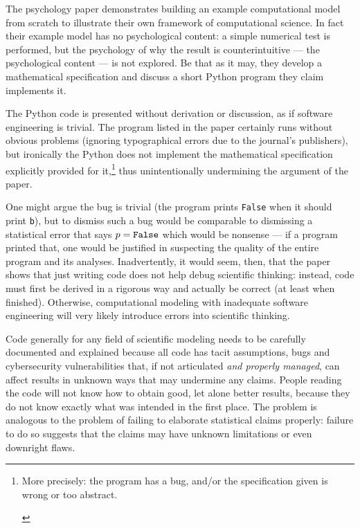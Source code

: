 \begin{change}
The psychology paper \cite{psychological-modeling} demonstrates building an example computational model from scratch to illustrate their own framework of computational science. In fact their example model has no psychological content: a simple numerical test is performed, but the psychology of why the result is counterintuitive --- the psychological content --- is not explored. Be that as it may, they develop a mathematical specification and discuss a short Python program they claim implements it. 

The Python code is presented without derivation or discussion, as if software engineering is trivial. The program listed in the paper certainly runs without obvious problems (ignoring typographical errors due to the journal's publishers), but ironically the Python does not implement the mathematical specification explicitly provided for it,\footnote{\begin{change}More precisely: the program has a bug, and/or the specification given is wrong or too abstract.\end{change}} thus unintentionally undermining the argument of the paper. 

One might argue the bug is trivial (the program prints \texttt{False} when it should print \texttt{b}), but to dismiss such a bug would be comparable to dismissing a statistical error that says $p=\mbox{\tt False}$ which would be nonsense --- if a program printed that, one would be justified in suspecting the quality of the entire program and its analyses. Inadvertently, it would seem, then, that the paper shows that just writing code does not help debug scientific thinking: instead, code must first be derived in a rigorous way and actually be correct (at least when finished). Otherwise, computational modeling with inadequate software engineering will very likely introduce errors into scientific thinking.
\end{change}

Code generally for any field of scientific modeling needs to be carefully documented and explained because all code has tacit assumptions, bugs and cybersecurity vulnerabilities \cite{Ben,nature-review,se-bias} that, if not articulated \emph{and properly managed}, can affect results in unknown ways that may undermine any claims. People reading the code will not know how to obtain good, let alone better results, because they do not know exactly what was intended in the first place. The problem is analogous to the problem of failing to elaborate statistical claims properly: failure to do so suggests that the claims may have unknown limitations or even downright flaws.


